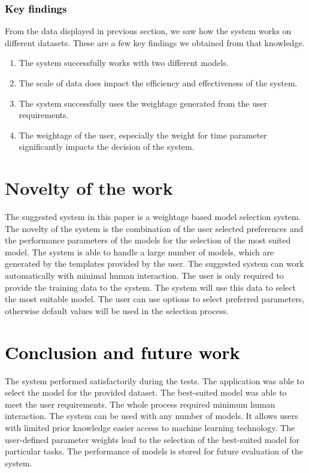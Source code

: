 \documentclass[a4paper,fleqn]{cas-dc}
\newcommand{\responsemod}{\color{black}}
\newcommand{\responsemodsm}[1]{\textcolor{black}{#1}}
\newcommand{\sectionb}[1]{\section{\responsemodsm{#1}}}
\newcommand{\subsubsectionb}[1]{\subsubsection{\responsemodsm{#1}}}
\begin{document}
\subsubsectionb{Key findings}\label{subsubsec:key_findings}

From the data displayed in previous section, we saw how the system works on different datasets. These are a few key findings we obtained from that knowledge.
\begin{enumerate}
    \item The system successfully works with two different models.
    \item The scale of data does impact the efficiency and effectiveness of the system.
    \item The system successfully uses the weightage generated from the user requirements.
    \item The weightage of the user, especially the weight for time parameter significantly impacts the decision of the system.
\end{enumerate}

{\responsemod
\section{Novelty of the work}\label{sec:novelty_of_the_work}

The suggested system in this paper is a weightage based model selection system. The novelty of the system is the combination of the user selected preferences and the performance parameters of the models for the selection of the most suited model. The system is able to handle a large number of models, which are generated by the templates provided by the user. The suggested system can work automatically with minimal human interaction. The user is only required to provide the training data to the system. The system will use this data to select the most suitable model. The user can use options to select preferred parameters, otherwise default values will be used in the selection process.
}

\sectionb{Conclusion and future work}\label{sec:conclusion_and_futur_work}

The system performed satisfactorily during the tests. The application was able to select the model for the provided dataset. The best-suited model was able to meet the user requirements. The whole process required minimum human interaction. The system can be used with any number of models. It allows users with limited prior knowledge easier access to machine learning technology. The user-defined parameter weights lead to the selection of the best-suited model for particular tasks. The performance of models is stored for future evaluation of the system.
\end{document}
